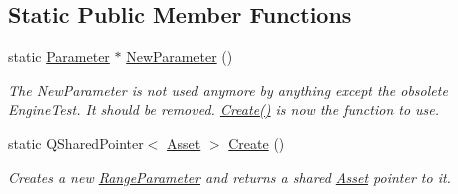 \subsection*{Static Public Member Functions}
\begin{DoxyCompactItemize}
\item 
\hypertarget{class_picto_1_1_range_parameter_a868672bcf2b900135b4b9aa77cd74159}{static \hyperlink{class_picto_1_1_parameter}{Parameter} $\ast$ \hyperlink{class_picto_1_1_range_parameter_a868672bcf2b900135b4b9aa77cd74159}{New\-Parameter} ()}\label{class_picto_1_1_range_parameter_a868672bcf2b900135b4b9aa77cd74159}

\begin{DoxyCompactList}\small\item\em The New\-Parameter is not used anymore by anything except the obsolete Engine\-Test. It should be removed. \hyperlink{class_picto_1_1_range_parameter_a47f03a5058c19aebe3abf64b8d587c32}{Create()} is now the function to use. \end{DoxyCompactList}\item 
\hypertarget{class_picto_1_1_range_parameter_a47f03a5058c19aebe3abf64b8d587c32}{static Q\-Shared\-Pointer$<$ \hyperlink{class_picto_1_1_asset}{Asset} $>$ \hyperlink{class_picto_1_1_range_parameter_a47f03a5058c19aebe3abf64b8d587c32}{Create} ()}\label{class_picto_1_1_range_parameter_a47f03a5058c19aebe3abf64b8d587c32}

\begin{DoxyCompactList}\small\item\em Creates a new \hyperlink{class_picto_1_1_range_parameter}{Range\-Parameter} and returns a shared \hyperlink{class_picto_1_1_asset}{Asset} pointer to it. \end{DoxyCompactList}\end{DoxyCompactItemize}
